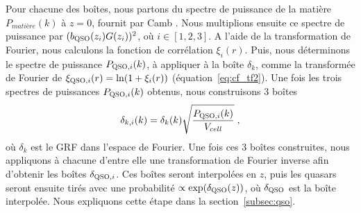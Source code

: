 \documentclass[11pt, twoside, a4paper, openright]{report}
\begin{document}
Pour chacune des boîtes, nous partons du spectre de puissance de la matière $P_{matière}(k)$ à $z=0$, fournit par Camb \citep{Lewis1999}. Nous multiplions ensuite ce spectre de puissance par $(b_{\textsc{QSO}}(z_i) G(z_i))^2$, où $i \in [1, 2, 3]$. A l'aide de la transformation de Fourier, nous calculons la fonction de corrélation $\xi_{i}(r)$. Puis, nous déterminons le spectre de puissance $P_{\textsc{QSO},i}(k)$, à appliquer à la boîte $\delta_k$, comme la transformée de Fourier de $\xi_{\textsc{QSO},i}(r) = \ln(1+\xi_i(r))$ (équation~\ref{eq:cf_tf2}).
Une fois les trois spectres de puissances $P_{\textsc{QSO},i}(k)$ obtenus, nous construisons 3 boîtes
\begin{equation}
  \delta_{k,i}(k)  = \delta_k(k) \sqrt{\frac{P_{\textsc{QSO},i}(k)}{V_{cell}}} \; ,
\end{equation}
où $\delta_k$ est le GRF dans l'espace de Fourier. Une fois ces 3 boîtes construites, nous appliquons à chacune d'entre elle une transformation de Fourier inverse afin d'obtenir les boîtes $\delta_{\textsc{QSO}, i}$. Ces boîtes seront interpolées en $z$, puis les quasars seront ensuite tirés avec une probabilité $\propto \exp(\delta_{\textsc{QSO}}(z))$, où $\delta_{\textsc{QSO}}$ est la boîte interpolée. Nous expliquons cette étape dans la section~\ref{subsec:qso}.
\end{document}
